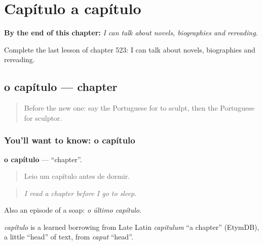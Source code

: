 
\chapter{Capítulo a capítulo}
\label{ch:pt-capitulo-a-capitulo}

\begin{chapteropening}
\textbf{By the end of this chapter:} \emph{I can talk about novels, biographies and rereading.}

Complete the last lesson of chapter 523: I can talk about novels, biographies and rereading.
\end{chapteropening}

\section[o capítulo]{o capítulo — chapter}

\label{lesson:PT-C523-capitulo}



\begin{quote}
Before the new one: say the Portuguese for to sculpt, then the Portuguese for sculptor.
\end{quote}

\subsection*{You'll want to know: o capítulo}
\textbf{o capítulo} — \textquotedblleft{}chapter\textquotedblright{}.

\begin{quote}
Leio um capítulo antes de dormir.
\end{quote}

\begin{quote}
\emph{I read a chapter before I go to sleep.}
\end{quote}

Also an episode of a soap: \emph{o último capítulo}.

\begin{cousinweb}
\emph{capítulo} is a learned borrowing from Late Latin \emph{capitulum} \textquotedblleft{}a chapter\textquotedblright{} (EtymDB), a little \textquotedblleft{}head\textquotedblright{} of text, from \emph{caput} \textquotedblleft{}head\textquotedblright{}.
\end{cousinweb}

